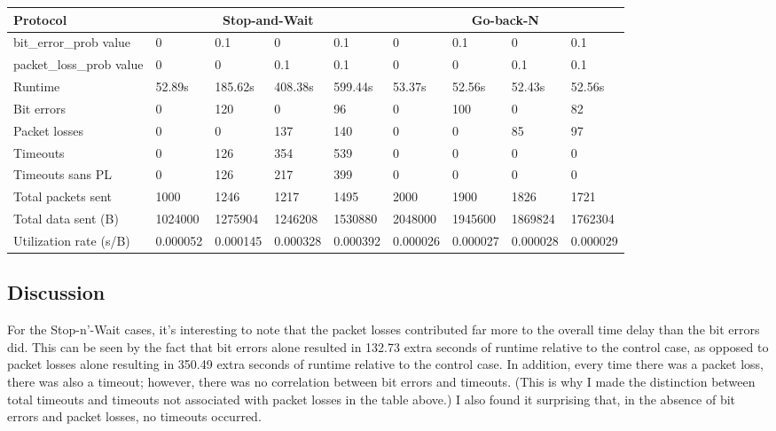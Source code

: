 \documentclass{article}
\begin{document}
\begin{center}
\begin{tabular}{@{}l|llllllll@{}}
\toprule
Protocol                                       & \multicolumn{4}{c}{Stop-and-Wait}         & \multicolumn{4}{c}{Go-back-N}             \\ \midrule
bit\_error\_prob value                         & 0        & 0.1      & 0        & 0.1      & 0        & 0.1      & 0        & 0.1      \\
packet\_loss\_prob value                       & 0        & 0        & 0.1      & 0.1      & 0        & 0        & 0.1      & 0.1      \\
Runtime                                        & 52.89s   & 185.62s  & 408.38s  & 599.44s  & 53.37s   & 52.56s   & 52.43s   & 52.56s   \\
Bit errors                                     & 0        & 120      & 0        & 96       & 0        & 100      & 0        & 82       \\
Packet losses                                  & 0        & 0        & 137      & 140      & 0        & 0        & 85       & 97       \\
Timeouts                                       & 0        & 126      & 354      & 539      & 0        & 0        & 0        & 0        \\
Timeouts sans PL                    & 0        & 126      & 217      & 399      & 0        & 0        & 0        & 0        \\
Total packets sent & 1000     & 1246     & 1217     & 1495     & 2000     & 1900     & 1826     & 1721     \\
Total data sent (B)                       & 1024000  & 1275904  & 1246208  & 1530880  & 2048000  & 1945600  & 1869824  & 1762304  \\
Utilization rate (s/B)                              & 0.000052 & 0.000145 & 0.000328 & 0.000392 & 0.000026 & 0.000027 & 0.000028 & 0.000029 \\ \bottomrule
\end{tabular}
\end{center}

\subsection{Discussion}

For the Stop-n'-Wait cases, it's interesting to note that the packet losses contributed far more to the overall time delay than the bit errors did. This can be seen by the fact that bit errors alone resulted in 132.73 extra seconds of runtime relative to the control case, as opposed to packet losses alone resulting in 350.49 extra seconds of runtime relative to the control case. In addition, every time there was a packet loss, there was also a timeout; however, there was no correlation between bit errors and timeouts. (This is why I made the distinction between total timeouts and timeouts not associated with packet losses in the table above.) I also found it surprising that, in the absence of bit errors and packet losses, no timeouts occurred.
\end{document}
